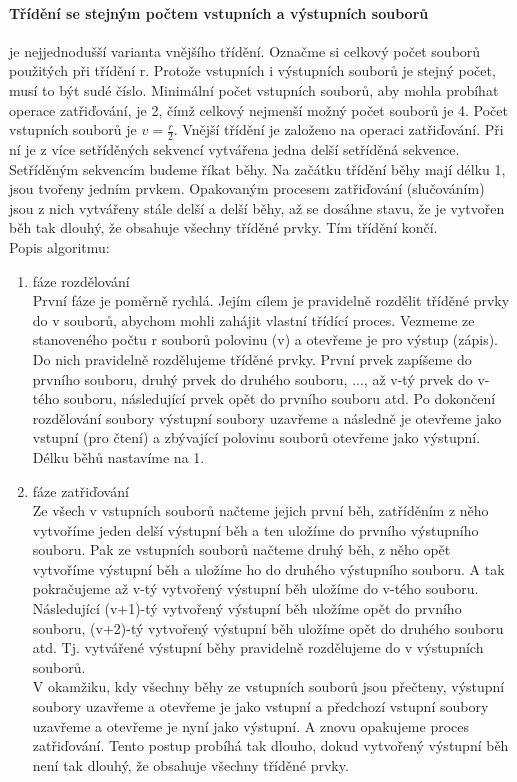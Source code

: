\documentclass[10pt,a4paper]{article}
\begin{document}
\paragraph{Třídění se stejným počtem vstupních a výstupních souborů} je nejjednodušší varianta vnějšího třídění. Označme si celkový počet souborů použitých při třídění r. Protože vstupních i výstupních souborů je stejný počet, musí to být sudé číslo. Minimální počet vstupních souborů, aby mohla probíhat operace zatřiďování, je 2, čímž celkový nejmenší možný počet souborů je 4. Počet vstupních souborů je $v = \frac{r}{2}$. Vnější třídění je založeno na operaci zatřiďování. Při ní je z více setříděných sekvencí vytvářena jedna delší setříděná sekvence. Setříděným sekvencím budeme říkat běhy. Na začátku třídění běhy mají délku 1, jsou tvořeny jedním prvkem. Opakovaným procesem zatřiďování (slučováním) jsou z nich vytvářeny stále delší a delší běhy, až se dosáhne stavu, že je vytvořen běh tak dlouhý, že obsahuje všechny tříděné prvky. Tím třídění končí. \\
Popis algoritmu:
\begin{enumerate}
	\item fáze rozdělování \\
	První fáze je poměrně rychlá. Jejím cílem je pravidelně rozdělit tříděné prvky do v souborů, abychom mohli zahájit vlastní třídící proces. Vezmeme ze stanoveného počtu r souborů polovinu (v) a otevřeme je pro výstup (zápis). Do nich pravidelně rozdělujeme tříděné prvky. První prvek zapíšeme do prvního souboru, druhý prvek do druhého souboru, ..., až v-tý prvek do v-tého souboru, následující prvek opět do prvního souboru atd. Po dokončení rozdělování soubory výstupní soubory uzavřeme a následně je otevřeme jako vstupní (pro čtení) a zbývající polovinu souborů otevřeme jako výstupní. Délku běhů nastavíme na 1.
	\item fáze zatřiďování \\
	Ze všech v vstupních souborů načteme jejich první běh, zatříděním z něho vytvoříme jeden delší výstupní běh a ten uložíme do prvního výstupního souboru. Pak ze vstupních souborů načteme druhý běh, z něho opět vytvoříme výstupní běh a uložíme ho do druhého výstupního souboru. A tak pokračujeme až v-tý vytvořený výstupní běh uložíme do v-tého souboru. Následující (v+1)-tý vytvořený výstupní běh uložíme opět do prvního souboru, (v+2)-tý vytvořený výstupní běh uložíme opět do druhého souboru atd. Tj. vytvářené výstupní běhy pravidelně rozdělujeme do v výstupních souborů. \\
	V okamžiku, kdy všechny běhy ze vstupních souborů jsou přečteny, výstupní soubory uzavřeme a otevřeme je jako vstupní a předchozí vstupní soubory uzavřeme a otevřeme je nyní jako výstupní. A znovu opakujeme proces zatřiďování. Tento postup probíhá tak dlouho, dokud vytvořený výstupní běh není tak dlouhý, že obsahuje všechny tříděné prvky.
\end{enumerate}
\end{document}
